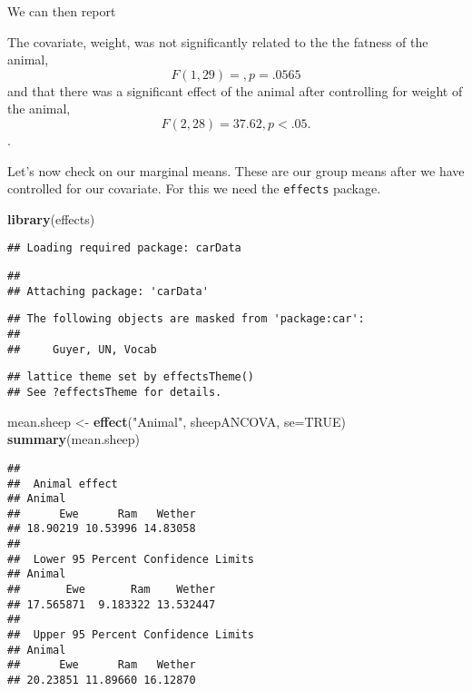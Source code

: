 \documentclass[]{book}
\newenvironment{Shaded}{\begin{snugshade}}{\end{snugshade}}
\newcommand{\KeywordTok}[1]{\textcolor[rgb]{0.13,0.29,0.53}{\textbf{#1}}}
\newcommand{\DataTypeTok}[1]{\textcolor[rgb]{0.13,0.29,0.53}{#1}}
\newcommand{\StringTok}[1]{\textcolor[rgb]{0.31,0.60,0.02}{#1}}
\newcommand{\OtherTok}[1]{\textcolor[rgb]{0.56,0.35,0.01}{#1}}
\newcommand{\NormalTok}[1]{#1}
\theoremstyle{definition}
\theoremstyle{definition}
\theoremstyle{definition}
\theoremstyle{remark}
\begin{document}
We can then report

The covariate, weight, was not significantly related to the the fatness
of the animal, \[F(1, 29) =,p=.0565 \] and that there was a significant
effect of the animal after controlling for weight of the animal,
\[F(2,28) = 37.62, p < .05.\].

Let's now check on our marginal means. These are our group means after
we have controlled for our covariate. For this we need the
\texttt{effects} package.

\begin{Shaded}
\begin{Highlighting}[]
\KeywordTok{library}\NormalTok{(effects)}
\end{Highlighting}
\end{Shaded}

\begin{verbatim}
## Loading required package: carData
\end{verbatim}

\begin{verbatim}
## 
## Attaching package: 'carData'
\end{verbatim}

\begin{verbatim}
## The following objects are masked from 'package:car':
## 
##     Guyer, UN, Vocab
\end{verbatim}

\begin{verbatim}
## lattice theme set by effectsTheme()
## See ?effectsTheme for details.
\end{verbatim}

\begin{Shaded}
\begin{Highlighting}[]
\NormalTok{mean.sheep <-}\StringTok{ }\KeywordTok{effect}\NormalTok{(}\StringTok{"Animal"}\NormalTok{, sheepANCOVA, }\DataTypeTok{se=}\OtherTok{TRUE}\NormalTok{)}
\KeywordTok{summary}\NormalTok{(mean.sheep)}
\end{Highlighting}
\end{Shaded}

\begin{verbatim}
## 
##  Animal effect
## Animal
##      Ewe      Ram   Wether 
## 18.90219 10.53996 14.83058 
## 
##  Lower 95 Percent Confidence Limits
## Animal
##       Ewe       Ram    Wether 
## 17.565871  9.183322 13.532447 
## 
##  Upper 95 Percent Confidence Limits
## Animal
##      Ewe      Ram   Wether 
## 20.23851 11.89660 16.12870
\end{verbatim}
\end{document}
